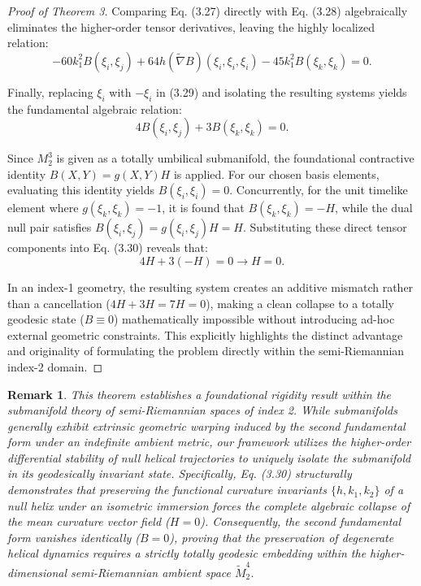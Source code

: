 \documentclass [reqno]{amsart}
\theoremstyle{plain}
\newtheorem{remark}{Remark}
\numberwithin{equation}{section}
\begin{document}
\begin{proof}[Proof of Theorem 3]
Comparing Eq. (3.27) directly with Eq. (3.28) algebraically eliminates the higher-order tensor derivatives, leaving the highly localized relation:
\begin{equation}
-60k_1^2 B(\xi_i,\xi_j)+64h(\tilde{\nabla} B)(\xi_i,\xi_i,\xi_i)-45k_1^2 B(\xi_k,\xi_k)=0.
\end{equation}

Finally, replacing $\xi_i$ with $-\xi_i$ in (3.29) and isolating the resulting systems yields the fundamental algebraic relation:
\begin{equation}
4B(\xi_i,\xi_j)+3B(\xi_k,\xi_k)=0.
\end{equation}

Since $M_2^3$ is given as a totally umbilical submanifold, the foundational contractive identity $B(X,Y)=g(X,Y)H$ is applied. For our chosen basis elements, evaluating this identity yields $B(\xi_i,\xi_i)=0$. Concurrently, for the unit timelike element where $g(\xi_k,\xi_k)=-1$, it is found that $B(\xi_k,\xi_k)=-H$, while the dual null pair satisfies $B(\xi_i,\xi_j)=g(\xi_i,\xi_j)H=H$. Substituting these direct tensor components into Eq. (3.30) reveals that:
\[
4H+3(-H)=0 \rightarrow H=0.
\]

In an index-1 geometry, the resulting system creates an additive mismatch rather than a cancellation ($4H+3H=7H=0$), making a clean collapse to a totally geodesic state ($B \equiv 0$) mathematically impossible without introducing ad-hoc external geometric constraints. This explicitly highlights the distinct advantage and originality of formulating the problem directly within the semi-Riemannian index-2 domain.
\end{proof}

\begin{remark}
This theorem establishes a foundational rigidity result within the submanifold theory of semi-Riemannian spaces of index 2. While submanifolds generally exhibit extrinsic geometric warping induced by the second fundamental form under an indefinite ambient metric, our framework utilizes the higher-order differential stability of null helical trajectories to uniquely isolate the submanifold in its geodesically invariant state. Specifically, Eq. (3.30) structurally demonstrates that preserving the functional curvature invariants $\{h,k_1,k_2\}$ of a null helix under an isometric immersion forces the complete algebraic collapse of the mean curvature vector field ($H=0$). Consequently, the second fundamental form vanishes identically ($B=0$), proving that the preservation of degenerate helical dynamics requires a strictly totally geodesic embedding within the higher-dimensional semi-Riemannian ambient space $\tilde{M}_2^4$.
\end{remark}
\end{document}
